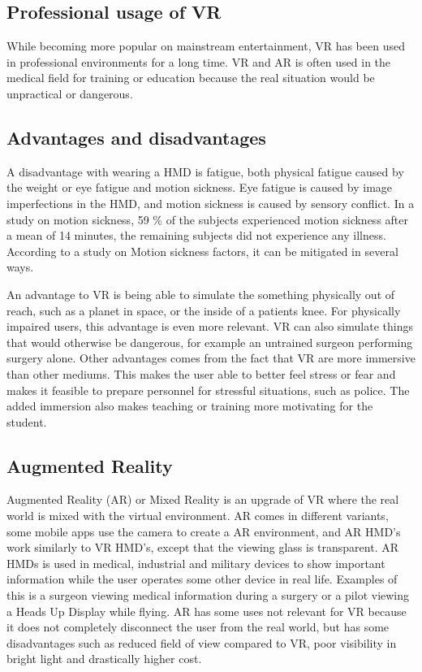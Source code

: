 \documentclass[a4paper]{report}
\begin{document}
\subsection{Professional usage of VR}
While becoming more popular on mainstream entertainment, VR has been used in professional environments for a long time\cite{needed}. VR and AR is often used in the medical field for training or education because the real situation would be unpractical or dangerous\cite{freina_immersive_2015}.

\subsection{Advantages and disadvantages}
A disadvantage with wearing a HMD is fatigue, both physical fatigue caused by the weight or eye fatigue and motion sickness\cite{merhi_motion_2007}.
Eye fatigue is caused by image imperfections in the HMD\cite{kooi_visual_2004}, and motion sickness is caused by sensory conflict.
In a study on motion sickness, 59 \% of the subjects experienced motion sickness after a mean of 14 minutes, the remaining subjects did not experience any illness\cite{kooi_visual_2004}. According to a study on Motion sickness factors, it can be mitigated in several ways.

An advantage to VR is being able to simulate the something physically out of reach, such as a planet in space, or the inside of a patients knee. For physically impaired users, this advantage is even more relevant.
VR can also simulate things that would otherwise be dangerous, for example an untrained surgeon performing surgery alone.
Other advantages comes from the fact that VR are more immersive than other mediums. This makes the user able to better feel stress or fear and makes it feasible to prepare personnel for stressful situations, such as police.
The added immersion also makes teaching or training more motivating for the student.\cite{freina_immersive_2015}

\subsection{ Augmented Reality }
Augmented Reality (AR) or Mixed Reality is an upgrade of VR where the real world is mixed with the virtual environment\cite{hackett_three-dimensional_2016}. AR comes in different variants, some mobile apps use the camera to create a AR environment, and AR HMD's work similarly to VR HMD's, except that the viewing glass is transparent.
AR HMDs is used in medical, industrial and military devices to show important information while the user operates some other device in real life. Examples of this is a surgeon viewing medical information during a surgery or a pilot viewing a Heads Up Display while flying\cite{mihelj_virtual_2014}.
AR has some uses not relevant for VR because it does not completely disconnect the user from the real world, but has some disadvantages such as reduced field of view compared to VR, poor visibility in bright light\cite{hackett_three-dimensional_2016} and drastically higher cost\cite{medical_holodeck_medicalholodeck_nodate}.
\end{document}
